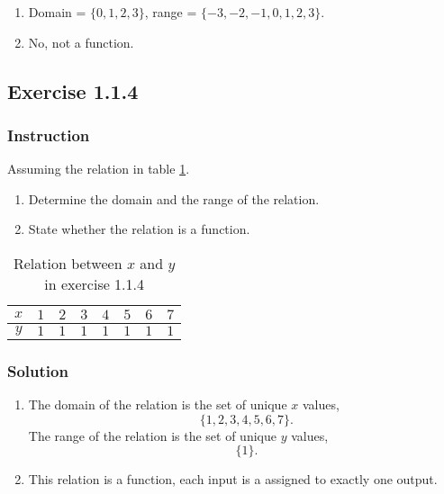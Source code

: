 \documentclass[11pt, letterpaper, oneside]{memoir}
\begin{document}
\begin{enumerate}[label=(\alph*)]
  \item Domain = $ \{ 0, 1, 2, 3 \} $, range = $ \{ -3, -2, -1, 0, 1, 2, 3 \} $.
  \item No, not a function.
\end{enumerate}

\subsection*{Exercise 1.1.4}

\subsubsection{Instruction}

Assuming the relation in table \ref{table:exercise-1.1.4}.
\begin{enumerate}[label=(\alph*)]
  \item Determine the domain and the range of the relation.
  \item State whether the relation is a function.
\end{enumerate}

\begin{table}[ht]
  \centering
  \begin{tabular}{ c | r r r r r r r }
    \hline
    $ x $ & $ 1 $ & $ 2 $ & $ 3 $ & $ 4 $ & $ 5 $ & $ 6 $ & $ 7 $ \\
    \hline
    $ y $ & $ 1 $ & $ 1 $ & $ 1 $ & $ 1 $ & $ 1 $ & $ 1 $ & $ 1 $ \\
    \hline
  \end{tabular}
  \caption{Relation between $ x $ and $ y $ in exercise 1.1.4}
  \label{table:exercise-1.1.4}
\end{table}

\subsubsection{Solution}

\begin{enumerate}[label=(\alph*)]
  \item The domain of the relation is the set of unique $ x $ values,
    $$ \phantom{.}
    \{ 1, 2, 3, 4, 5, 6, 7 \}
    .$$
    The range of the relation is the set of unique $ y $ values,
    $$ \phantom{.}
    \{ 1 \}
    .$$
  \item This relation is a function, each input is a assigned to exactly one output.
\end{enumerate}
\end{document}
